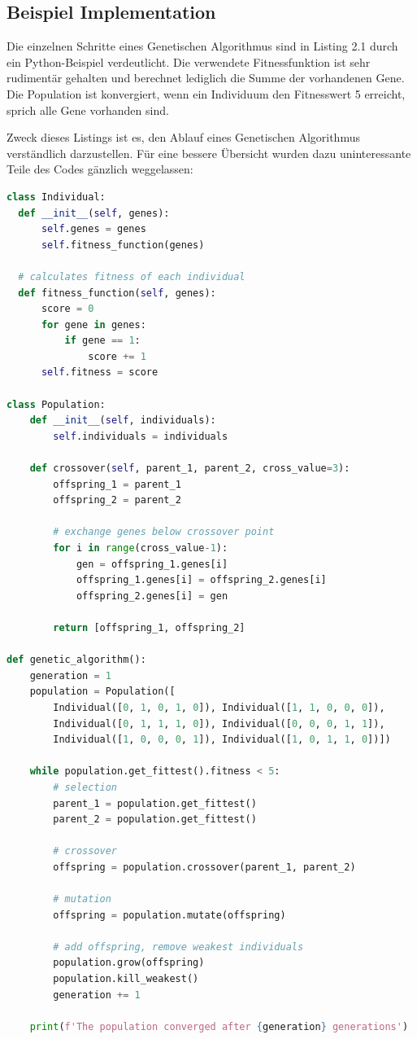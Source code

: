 \subsection{Beispiel Implementation}
Die einzelnen Schritte eines Genetischen Algorithmus sind in Listing 2.1 durch
ein Python-Beispiel verdeutlicht. Die verwendete Fitnessfunktion ist sehr rudimentär
gehalten und berechnet lediglich die Summe der vorhandenen Gene. Die Population ist konvergiert,
wenn ein Individuum den Fitnesswert 5 erreicht, sprich alle Gene vorhanden sind.

Zweck dieses Listings ist es, den Ablauf eines Genetischen Algorithmus verständlich darzustellen.
Für eine bessere Übersicht wurden dazu uninteressante Teile des Codes gänzlich weggelassen: \\

\begin{lstlisting}[language=Python, caption=Genetischer Algorithmus (Python)]
class Individual:
  def __init__(self, genes):
      self.genes = genes
      self.fitness_function(genes)
  
  # calculates fitness of each individual
  def fitness_function(self, genes):
      score = 0
      for gene in genes:
          if gene == 1:
              score += 1
      self.fitness = score

class Population:
    def __init__(self, individuals):
        self.individuals = individuals
    
    def crossover(self, parent_1, parent_2, cross_value=3):
        offspring_1 = parent_1
        offspring_2 = parent_2
        
        # exchange genes below crossover point
        for i in range(cross_value-1):
            gen = offspring_1.genes[i]
            offspring_1.genes[i] = offspring_2.genes[i]
            offspring_2.genes[i] = gen
        
        return [offspring_1, offspring_2]

def genetic_algorithm():
    generation = 1
    population = Population([
        Individual([0, 1, 0, 1, 0]), Individual([1, 1, 0, 0, 0]),
        Individual([0, 1, 1, 1, 0]), Individual([0, 0, 0, 1, 1]),
        Individual([1, 0, 0, 0, 1]), Individual([1, 0, 1, 1, 0])])

    while population.get_fittest().fitness < 5:
        # selection
        parent_1 = population.get_fittest()
        parent_2 = population.get_fittest()

        # crossover
        offspring = population.crossover(parent_1, parent_2)

        # mutation
        offspring = population.mutate(offspring)

        # add offspring, remove weakest individuals
        population.grow(offspring)
        population.kill_weakest()
        generation += 1

    print(f'The population converged after {generation} generations')
\end{lstlisting}

